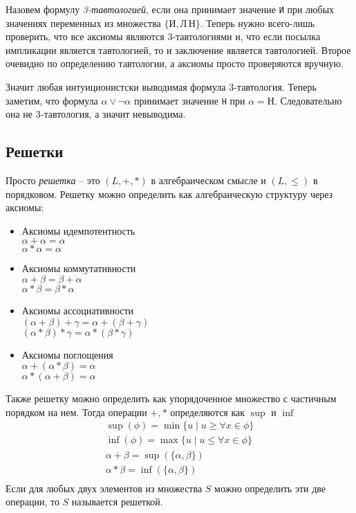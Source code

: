 Назовем формулу \emph{3-тавтологией}, если она принимает значение
\texttt{И} при любых значениях переменных из множества $\{\texttt{И}, \texttt{Л}\, \texttt{Н}\}$. Теперь нужно всего-лишь проверить, что все аксиомы являются 3-тавтологиями и, что если посылка импликации является тавтологией, то и заключение является тавтологией. Второе очевидно по определению тавтологии, а аксиомы просто проверяются вручную.

Значит любая интуиционистски выводимая формула 3-тавтология. Теперь заметим, что формула $\alpha \vee \neg \alpha$ принимает значение \texttt{Н} при $\alpha = \texttt{Н}$. Следовательно она не 3-тавтология, а значит невыводима.
\subsection{Решетки}
\label{sec-5-3}
Просто \emph{решетка} -- это $(L, +, *)$ в алгебраическом смысле и $(L, \leq)$ в порядковом. Решетку можно определить как алгебраическую структуру через аксиомы: 
\begin{itemize}
\item Аксиомы идемпотентность\\
$\alpha + \alpha = \alpha$\\
$\alpha * \alpha = \alpha$
\item Аксиомы коммутативности\\
$\alpha + \beta = \beta + \alpha$\\
$\alpha * \beta = \beta * \alpha$
\item Аксиомы ассоциативности\\
$(\alpha + \beta) + \gamma = \alpha + (\beta + \gamma)$\\
$(\alpha * \beta) * \gamma = \alpha * (\beta * \gamma)$
\item Аксиомы поглощения\\
$\alpha + (\alpha * \beta) = \alpha$\\
$\alpha * (\alpha + \beta) = \alpha$
\end{itemize} 
Также решетку можно определить как упорядоченное множество с частичным порядком на нем. Тогда операции $+, *$ определяются как $\sup$ и $\inf$
\begin{gather*}
\sup(\phi) = \min \lbrace u \mid u \geq \forall x \in \phi \rbrace\\
\inf(\phi) = \max \lbrace u \mid u \leq \forall x \in \phi \rbrace\\
\alpha + \beta = \sup (\lbrace \alpha, \beta \rbrace)\\
\alpha * \beta = \inf (\lbrace \alpha, \beta \rbrace)\\
\end{gather*}
Если для любых двух элементов из множества $S$ можно определить эти две операции, то $S$ называется решеткой.

